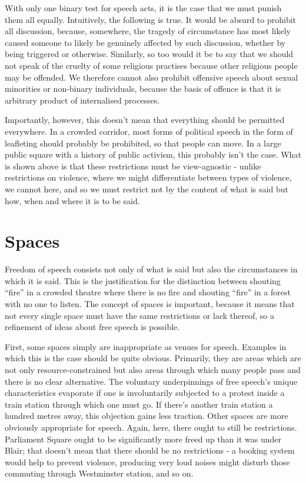 \documentclass[10pt,a4paper,twoside]{article}
\begin{document}
\begin{multicols}{2}
With only one binary test for speech acts, it is the case that we must
punish them all equally. Intuitively, the following is true. It would be
absurd to prohibit all discussion, because, somewhere, the tragedy of
circumstance has most likely caused someone to likely be genuinely
affected by such discussion, whether by being triggered or otherwise.
Similarly, so too would it be to say that we should not speak of the
cruelty of some religious practises because other religious people may
be offended. We therefore cannot also prohibit offensive speech about
sexual minorities or non-binary individuals, because the basis of
offence is that it is arbitrary product of internalised processes.

Importantly, however, this doesn't mean that everything should be
permitted everywhere. In a crowded corridor, most forms of political
speech in the form of leafleting should probably be prohibited, so that
people can move. In a large public square with a history of public
activism, this probably isn't the case. What is shown above is that
these restrictions must be view-agnostic - unlike restrictions on
violence, where we might differentiate between types of violence, we
cannot here, and so we must restrict not by the content of what is said
but how, when and where it is to be said.

\section{Spaces}

Freedom of speech consists not only of what is said but also the
circumstances in which it is said. This is the justification for the
distinction between shouting ``fire'' in a crowded theatre where there
is no fire and shouting ``fire'' in a forest with no one to listen. The
concept of spaces is important, because it means that not every single
space must have the same restrictions or lack thereof, so a refinement
of ideas about free speech is possible.

First, some spaces simply are inappropriate as venues for speech.
Examples in which this is the case should be quite obvious. Primarily,
they are areas which are not only resource-constrained but also areas
through which many people pass and there is no clear alternative. The
voluntary underpinnings of free speech's unique characteristics
evaporate if one is involuntarily subjected to a protest inside a train
station through which one must go. If there's another train station a
hundred metres away, this objection gains less traction. Other spaces
are more obviously appropriate for speech. Again, here, there ought to
still be restrictions. Parliament Square ought to be significantly more
freed up than it was under Blair; that doesn't mean that there should be
no restrictions - a booking system would help to prevent violence,
producing very loud noises might disturb those commuting through
Westminster station, and so on.


\end{multicols}
\end{document}
